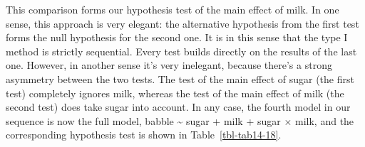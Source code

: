 \documentclass[
  a4paper,
]{book}
\begin{document}
This comparison forms our hypothesis test of the main effect of milk. In
one sense, this approach is very elegant: the alternative hypothesis
from the first test forms the null hypothesis for the second one. It is
in this sense that the type I method is strictly sequential. Every test
builds directly on the results of the last one. However, in another
sense it's very inelegant, because there's a strong asymmetry between
the two tests. The test of the main effect of sugar (the first test)
completely ignores milk, whereas the test of the main effect of milk
(the second test) does take sugar into account. In any case, the fourth
model in our sequence is now the full model, babble \textasciitilde{}
sugar + milk + sugar \(\times\) milk, and the corresponding hypothesis
test is shown in Table~\ref{tbl-tab14-18}.

\hypertarget{tbl-tab14-18}{}
 
  \providecommand{\huxb}[2]{\arrayrulecolor[RGB]{#1}\global\arrayrulewidth=#2pt}
  \providecommand{\huxvb}[2]{\color[RGB]{#1}\vrule width #2pt}
  \providecommand{\huxtpad}[1]{\rule{0pt}{#1}}
  \providecommand{\huxbpad}[1]{\rule[-#1]{0pt}{#1}}
\end{document}

